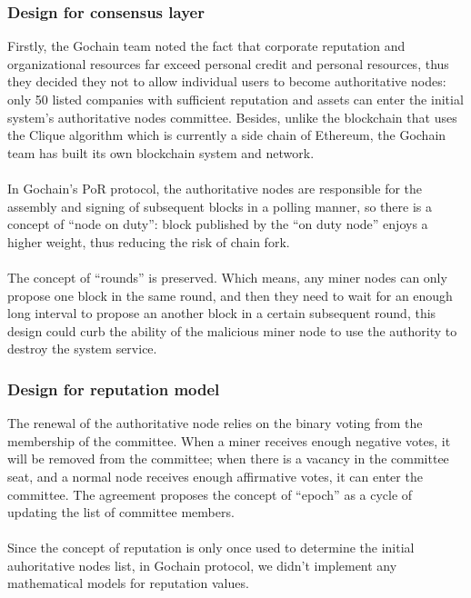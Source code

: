 \documentclass[doublespacing]{bmcart}
\begin{document}
\begin{CJK*}{UTF8}{gbsn}
	\subsubsection*{Design for consensus layer}  
	Firstly, the Gochain team noted the fact that corporate reputation and organizational resources far exceed personal credit and personal resources, thus they decided they not to allow individual users to become authoritative nodes: only 50 listed companies with sufficient reputation and assets can enter the initial system’s authoritative nodes committee. Besides, unlike the blockchain that uses the Clique algorithm which is currently a side chain of Ethereum, the Gochain team has built its own blockchain system and network.
	\paragraph{} 
	In Gochain's PoR protocol, the authoritative nodes are responsible for the assembly and signing of subsequent blocks in a polling manner, so there is a concept of ``node on duty'': block published by the ``on duty node'' enjoys a higher weight,
thus reducing the risk of chain fork.
	\paragraph{}	
	The concept of ``rounds'' is preserved. Which means, any miner nodes can only propose one block in the same round, and then they need to wait for an enough long interval to propose an another block in a certain subsequent round, this design could curb the ability of the malicious miner node to use the authority to destroy the system service.
	\subsubsection*{Design for reputation model}  
	The renewal of the authoritative node relies on the binary voting from the membership of  the committee. When a miner receives enough negative votes, it will be removed from the committee; when there is a vacancy in the committee seat, and a normal node receives enough affirmative votes, it can enter the committee. The agreement proposes the concept of ``epoch'' as a cycle of updating the list of committee members.
	\paragraph{}
	Since the concept of reputation is only once used to determine the initial auhoritative nodes list, in Gochain protocol, we didn't implement any mathematical models for reputation values. 
	

\end{CJK*}
\end{document}
